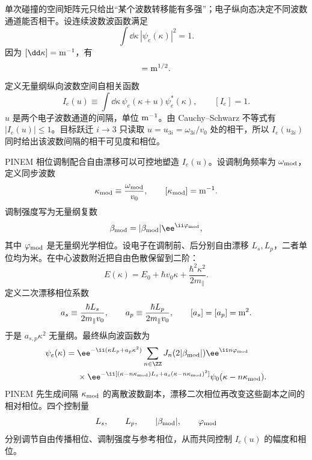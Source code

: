 单次碰撞的空间矩阵元只给出“某个波数转移能有多强”；电子纵向态决定不同波数通道能否相干。设连续波数波函数满足
\begin{equation*}
\int\dd \kappa\,|\psi_e(\kappa)|^2=1.
\end{equation*}
因为 $[\dd \kappa]={\rm m^{-1}}$，有
\begin{equation*}
[\psi_e(\kappa)]={\rm m^{1/2}}.
\end{equation*}
定义无量纲纵向波数空间自相关函数
\begin{equation*}
I_e(u)
\equiv\int\dd \kappa\,
\psi_e(\kappa+u)\psi_e^*(\kappa),
\qquad
[I_e]=1.
\end{equation*}
$u$ 是两个电子波数通道的间隔，单位 ${\rm m^{-1}}$。由 Cauchy--Schwarz 不等式有 $|I_e(u)|\le1$。目标跃迁 $i\to3$ 只读取 $u=u_{3i}=\omega_{3i}/v_0$ 处的相干，所以 $I_e(u_{3i})$ 同时给出该波数间隔的相干可见度和相位。

PINEM 相位调制配合自由漂移可以可控地塑造 $I_e(u)$。设调制角频率为 $\omega_{\rm mod}$，定义同步波数
\begin{equation*}
\kappa_{\rm mod}\equiv\frac{\omega_{\rm mod}}{v_0},
\qquad [\kappa_{\rm mod}]={\rm m^{-1}}.
\end{equation*}
调制强度写为无量纲复数
\begin{equation*}
\beta_{\rm mod}=|\beta_{\rm mod}|\ee^{\ii\varphi_{\rm mod}},
\end{equation*}
其中 $\varphi_{\rm mod}$ 是无量纲光学相位。设电子在调制前、后分别自由漂移 $L_s,L_p$，二者单位均为米。在中心波数附近把自由色散保留到二阶：
\begin{equation*}
E(\kappa)
=E_0+\hbar v_0\kappa
+\frac{\hbar^2\kappa^2}{2m_\parallel}.
\end{equation*}
定义二次漂移相位系数
\begin{equation*}
a_s\equiv\frac{\hbar L_s}{2m_\parallel v_0},
\qquad
a_p\equiv\frac{\hbar L_p}{2m_\parallel v_0},
\qquad
[a_s]=[a_p]={\rm m^2}.
\end{equation*}
于是 $a_{s,p}\kappa^2$ 无量纲。最终纵向波函数为
\begin{equation}
{
\begin{aligned}
\psi_e(\kappa)={}&
\ee^{-\ii(\kappa L_p+a_p\kappa^2)}
\sum_{n\in\ZZ}
J_n(2|\beta_{\rm mod}|)\ee^{\ii n\varphi_{\rm mod}}\\
&\times
\ee^{-\ii[(\kappa-n\kappa_{\rm mod})L_s
+a_s(\kappa-n\kappa_{\rm mod})^2]}
\psi_0(\kappa-n\kappa_{\rm mod}).
\end{aligned}}
\label{eq:shaped_electron_pinem_drift_wavefunction}
\end{equation}
PINEM 先生成间隔 $\kappa_{\rm mod}$ 的离散波数副本，漂移二次相位再改变这些副本之间的相对相位。四个控制量
\[
 L_s,\qquad L_p,\qquad |\beta_{\rm mod}|,\qquad \varphi_{\rm mod}
\]
分别调节自由传播相位、调制强度与参考相位，从而共同控制 $I_e(u)$ 的幅度和相位。

